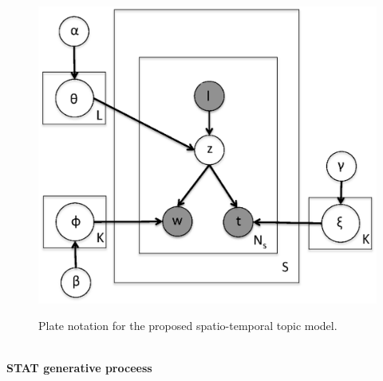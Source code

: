 \documentclass[twoside,leqno,twocolumn]{article}
\newcommand{\model}{{STAT}\xspace} %
\begin{document}
\vspace{-10pt}
\begin{figure}[h]
\captionsetup{font=scriptsize}
\begin{center}
       \includegraphics[trim = 30mm 35mm 70mm 25mm, clip, scale=0.3]{fig/stm_model.eps} \label{fig:stm_model}
\end{center}
\caption{Plate notation for the proposed spatio-temporal topic model.}
\vspace{-10pt}
\label{fig:stm_model}
\vspace{-5pt}

\end{figure}
\vspace{-10pt}\ \\{\bf \model generative proceess}
\end{document}
